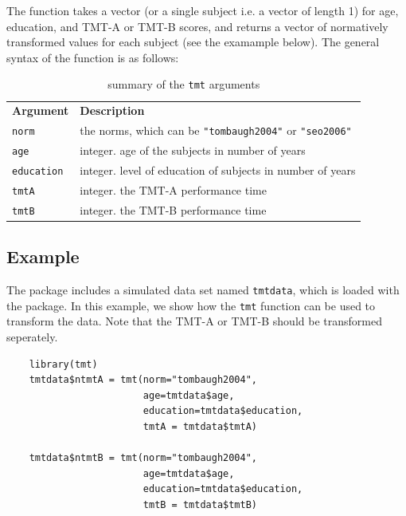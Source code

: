 \documentclass[]{article}
\begin{document}
The function takes a vector (or a single subject i.e. a vector of length 1) for age, education, and TMT-A or TMT-B scores, and returns a vector of normatively transformed values for each subject (see the examample below). The general syntax of the function is as follows:

\begin{table}[H]
	\caption{summary of the \texttt{tmt} arguments}
	\begin{tabular}{ll}
		\textbf{Argument} & \textbf{Description}                                                                                                                             \\
		\texttt{norm}              & the norms, which can be \texttt{"tombaugh2004"} or \texttt{"seo2006"} \\
		\texttt{age}               & integer. age of the subjects in number of years                                                                                                  \\
		\texttt{education}         & integer. level of education of subjects in number of years                                                                                       \\
		\texttt{tmtA}              & integer. the TMT-A performance time                                                                                                              \\
		\texttt{tmtB}              & integer. the TMT-B performance time                                                                                                             
	\end{tabular}
\end{table}



\subsection{Example}

The package includes a simulated data set named \texttt{tmtdata}, which is loaded with the package. In this example, we show how the \texttt{tmt} function can be used to transform the data. Note that the TMT-A or TMT-B should be transformed seperately. 

\begin{verbatim}
    library(tmt)
    tmtdata$ntmtA = tmt(norm="tombaugh2004", 
                        age=tmtdata$age, 
                        education=tmtdata$education,
                        tmtA = tmtdata$tmtA)
                    
    tmtdata$ntmtB = tmt(norm="tombaugh2004", 
                        age=tmtdata$age, 
                        education=tmtdata$education,
                        tmtB = tmtdata$tmtB)
\end{verbatim}
\end{document}
